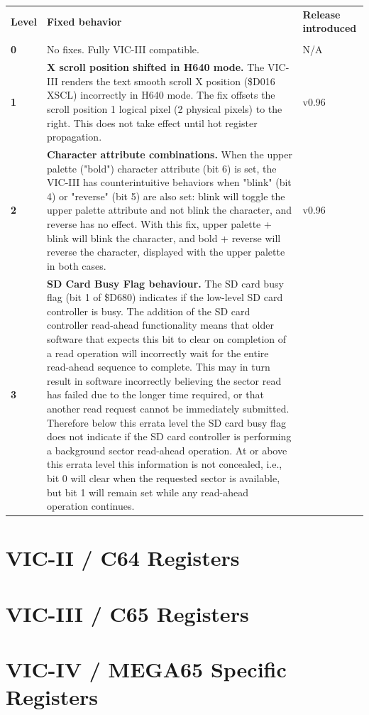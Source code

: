 \begin{longtable}{|p{2cm}|p{7.1cm}|p{2cm}|}
\hhline{---}
{\bf{Level}} & {\bf{Fixed behavior}} & {\bf{Release introduced}} \\
\hhline{---}
\endhead
\multicolumn{3}{l@{}}{continued \ldots}\\
\endfoot
\hline
\endlastfoot

{\bf{0}} & No fixes. Fully VIC-III compatible. & N/A \\

\hline
{\bf{1}} & {\bf{X scroll position shifted in H640 mode.}} The VIC-III renders the text smooth scroll X position (\$D016 XSCL) incorrectly in H640 mode. The fix offsets the scroll position 1 logical pixel (2 physical pixels) to the right. This does not take effect until hot register propagation. &
v0.96 \\

\hline
{\bf{2}} & {\bf{Character attribute combinations.}} When the upper palette ("bold") character attribute (bit 6) is set, the VIC-III has counterintuitive behaviors when "blink" (bit 4) or "reverse" (bit 5) are also set: blink will toggle the upper palette attribute and not blink the character, and reverse has no effect. With this fix, upper palette + blink will blink the character, and bold + reverse will reverse the character, displayed with the upper palette in both cases. &
v0.96 \\

\hline
{\bf{3}} & {\bf{SD Card Busy Flag behaviour.}} The SD card busy flag (bit 1 of \$D680) indicates if the low-level SD card controller is busy.  The addition of the SD card controller read-ahead functionality means that older software that expects this bit to clear on completion of a read operation will incorrectly wait for the entire read-ahead sequence to complete. This may in turn result in software incorrectly believing the sector read has failed due to the longer time required, or that another read request cannot be immediately submitted.  Therefore below this errata level the SD card busy flag does not indicate if the SD card controller is performing a background sector read-ahead operation. At or above this errata level this information is not concealed, i.e., bit 0 will clear when the requested sector is available, but bit 1 will remain set while any read-ahead operation continues.


\end{longtable}


\section{VIC-II / C64 Registers}



\section{VIC-III / C65 Registers}



\section{VIC-IV / MEGA65 Specific Registers}


